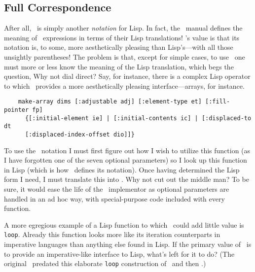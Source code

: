 \subsection {Full Correspondence}

After all, \cgol\ is simply another {\it notation} for Lisp.  In fact, the
\cgol\ manual defines the meaning of \cgol\ expressions in terms of their
Lisp translations!  \cgol's value is that its notation is, to some, more
aesthetically pleasing than Lisp's---with all those unsightly parentheses!
The problem is that, except for simple cases, to use \cgol\ one must more
or less know the meaning of the Lisp translation, which begs the question,
Why not dial direct?  Say, for instance, there is a complex Lisp operator
to which \cgol\ provides a more aesthetically pleasing interface---arrays,
for instance.

{\footnotesize\begin{verbatim}
    make-array dims [:adjustable adj] [:element-type et] [:fill-pointer fp]
      {[:initial-element ie] | [:initial-contents ic] | [:displaced-to dt
      [:displaced-index-offset dio]]}
\end{verbatim}}

To use the \cgol\ notation I must first figure out how I wish to utilize
this function (as I have forgotten one of the seven optional parameters) so
I look up this function in Lisp (which is how \cgol\ defines its notation).
Once having determined the Lisp form I need, I must translate this into
\cgol.  Why not cut out the middle man?  To be sure, it would ease the life
of the \cgol\ implementor as optional parameters are handled in an ad hoc
way, with special-purpose code included with every function.



A more egregious example of a Lisp function to which \cgol\ could add little
value is {\tt loop}.  Already this function looks more like its iteration
counterparts in imperative languages than anything else found in Lisp.  If
the primary value of \cgol\ is to provide an imperative-like interface to
Lisp, what's left for it to do? (The original \cgol\ predated this
elaborate {\tt loop} construction of \ml\ and then \cl .)

